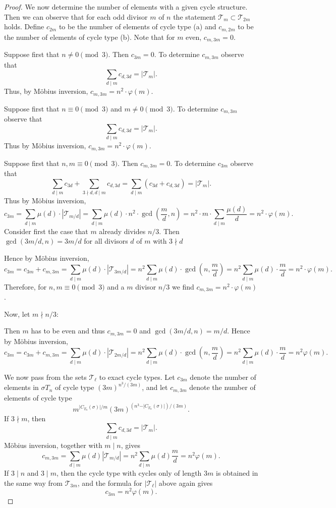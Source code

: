 \documentclass[12pt]{article}
\theoremstyle{definition}
\theoremstyle{remark}
\begin{document}
\begin{proof}
{\color{red}We now determine the number of elements with a given cycle structure.
Then we can observe that for each odd divisor $m$ of $n$ the statement $\mathcal{T}_m \subset \mathcal{T}_{2m}$ holds.
Define $c_{2m}$ to be the number of elements of cycle type (a) and
${c}_{m,2m}$ to  be the number of elements of cycle type (b). Note that for $m$ even, $c_{m,3m}=0.$

Suppose first that $n \neq 0 \pmod 3$. Then $c_{3m}=0$.
To determine
${c}_{m,3m}$ observe
that   \[\sum_{d\mid m} c_{d,3d}= |\mathcal{T}_m\vert .\]
Thus, by M\"obius inversion,
$c_{m,3m}=
n^2\cdot \varphi(m).$


Suppose first that $n \equiv 0 \pmod 3$ and $m \neq 0 \pmod 3$.
To determine
${c}_{m,3m}$ observe
that   \[\sum_{d\mid m} c_{d,3d}= |\mathcal{T}_m\vert .\]
Thus   by M\"obius inversion,
$c_{m,3m}=
n^2\cdot \varphi(m).$



Suppose first that $n,m \equiv  0 \pmod 3$. Then $c_{m,3m}=0$.
To determine
${c}_{3m}$ observe
that   \[\sum_{d\mid m} c_{3d}+\sum_{3\nmid d, d\mid m} c_{d,3d}=\sum_{d\mid m}( c_{3d}+ c_{d,3d})= |\mathcal{T}_m\vert .\]
Thus   by M\"obius inversion,
\[c_{3m} = \sum_{d\mid m} \mu(d) \cdot |\mathcal{T}_{m/d}|
=
\sum_{d\mid m} \mu(d) \cdot n^2\cdot \gcd\left( \frac{m}{d},n\right)
= n^2\cdot m\cdot  \sum_{d\mid m}  \frac{\mu(d)}{d} =
n^2\cdot \varphi(m).
\]
Consider first the case that $m$ already divides $n/3.$
Then $\gcd(3m/d,n) = 3m/d$ for all divisors $d$ of $m$ with $3\nmid d$

Hence by M\"obius inversion,
\[c_{3m}=c_{3m}+ c_{m,3m} = \sum_{d\mid m} \mu(d) \cdot |\mathcal{T}_{3m/d}|
= n^2\sum_{d\mid m} \mu(d) \cdot \gcd\left(n,\frac{m}{d}\right) = n^2\sum_{d\mid m} \mu(d) \cdot \frac{m}{d} = n^2 \cdot \varphi(m).
\]
Therefore, for $n,m \equiv 0 \pmod 3$ and a $m$ divisor $n/3$ we find $c_{m,3m} = n^2\cdot\varphi(m)$.

Now, let $m\nmid n/3:$

Then $m$ has to be even and thus $c_{m,3m}=0$
and  $\gcd( 3m/d, n)  = m/d.$
Hence by M\"obius inversion,
\[c_{3m}= c_{3m}+ c_{m,3m} = \sum_{d\mid m} \mu(d) \cdot |\mathcal{T}_{2m/d}|
= n^2\sum_{d\mid m} \mu(d) \cdot \gcd\left(n,\frac{m}{d}\right) = n^2\sum_{d\mid m} \mu(d) \cdot \frac{m}{d} = n^2\varphi(m).
\]
}
{\color{blue}We now pass from the sets $\mathcal T_\ell$ to exact cycle types.
Let $c_{3m}$ denote the number of elements in $\sigma T_n$ of cycle type $(3m)^{n^3/(3m)}$, and let $c_{m,3m}$ denote the number of elements of cycle type
\[
m^{\vert C_{T_n}(\sigma)\vert/m}
(3m)^{(n^3-\vert C_{T_n}(\sigma)\vert)/(3m)}.
\]
If $3\nmid m$, then
\[
\sum_{d\mid m}c_{d,3d}=|\mathcal T_m|.
\]
Möbius inversion, together with $m\mid n$, gives
\[
c_{m,3m}
=\sum_{d\mid m}\mu(d)|\mathcal T_{m/d}|
=n^2\sum_{d\mid m}\mu(d)\frac{m}{d}
=n^2\varphi(m).
\]
If $3\mid n$ and $3\mid m$, then the cycle type with cycles only of length $3m$ is obtained in the same way from $\mathcal T_{3m}$, and the formula for $|\mathcal T_\ell|$ above again gives
\[
c_{3m}=n^2\varphi(m).
\]}

\end{proof}
\newpage
\end{document}
